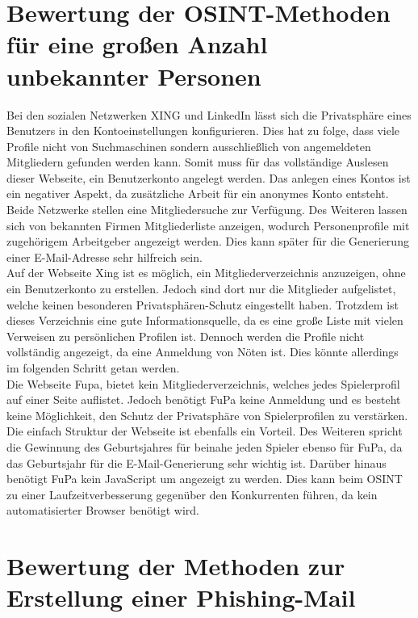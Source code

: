 \section{Bewertung der OSINT-Methoden für eine großen Anzahl unbekannter Personen}
Bei den sozialen Netzwerken XING und LinkedIn lässt sich die Privatsphäre eines Benutzers in den Kontoeinstellungen konfigurieren. Dies hat zu folge, dass viele Profile nicht von Suchmaschinen sondern ausschließlich von angemeldeten Mitgliedern gefunden werden kann. Somit muss für das vollständige Auslesen dieser Webseite, ein Benutzerkonto angelegt werden. Das anlegen eines Kontos ist ein negativer Aspekt, da zusätzliche Arbeit für ein anonymes Konto entsteht.\\ Beide Netzwerke stellen eine Mitgliedersuche zur Verfügung. Des Weiteren lassen sich von bekannten Firmen Mitgliederliste anzeigen, wodurch Personenprofile mit zugehörigem Arbeitgeber angezeigt werden. Dies kann später für die Generierung einer E-Mail-Adresse sehr hilfreich sein.\\
Auf der Webseite Xing ist es möglich, ein Mitgliederverzeichnis anzuzeigen, ohne ein Benutzerkonto zu erstellen. Jedoch sind dort nur die Mitglieder aufgelistet, welche keinen besonderen Privatsphären-Schutz eingestellt haben. Trotzdem ist dieses Verzeichnis eine gute Informationsquelle, da es eine große Liste mit vielen Verweisen zu persönlichen Profilen ist. Dennoch werden die Profile nicht vollständig angezeigt, da eine Anmeldung von Nöten ist. Dies könnte allerdings im folgenden Schritt getan werden.\\
Die Webseite Fupa, bietet kein Mitgliederverzeichnis, welches jedes Spielerprofil auf einer Seite auflistet. Jedoch benötigt FuPa keine Anmeldung und es besteht keine Möglichkeit, den Schutz der Privatsphäre von Spielerprofilen zu verstärken. Die einfach Struktur der Webseite ist ebenfalls ein Vorteil. Des Weiteren spricht die Gewinnung des Geburtsjahres für beinahe jeden Spieler ebenso für FuPa, da das Geburtsjahr für die E-Mail-Generierung sehr wichtig ist. Darüber hinaus benötigt FuPa kein JavaScript um angezeigt zu werden. Dies kann beim OSINT zu einer Laufzeitverbesserung gegenüber den Konkurrenten führen, da kein automatisierter Browser benötigt wird.

\section{Bewertung der Methoden zur Erstellung einer Phishing-Mail}
